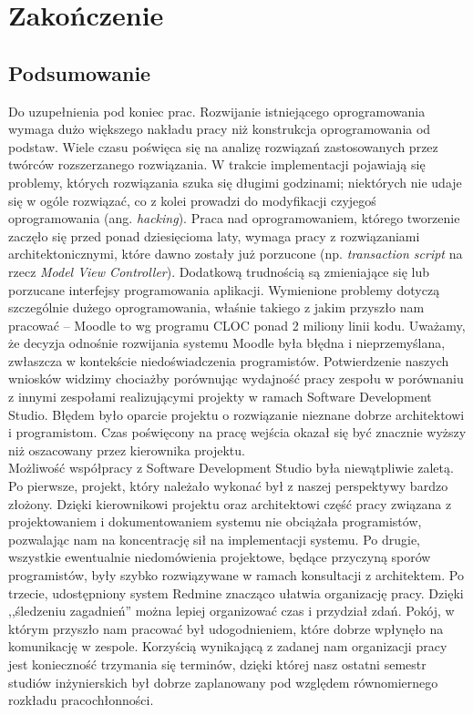 \chapter{Zakończenie}
\label{Chapter9}

\section{Podsumowanie}
\label{Chapter91}

{\color{red}Do uzupełnienia pod koniec prac.}
Rozwijanie istniejącego oprogramowania wymaga dużo większego nakładu pracy niż konstrukcja oprogramowania od podstaw. Wiele czasu poświęca się na analizę rozwiązań zastosowanych przez twórców rozszerzanego rozwiązania. W trakcie implementacji pojawiają się problemy, których rozwiązania szuka się długimi godzinami; niektórych nie udaje się w ogóle rozwiązać, co z kolei prowadzi do modyfikacji czyjegoś oprogramowania (ang. \emph{hacking}). Praca nad oprogramowaniem, którego tworzenie zaczęło się przed ponad dziesięcioma laty, wymaga pracy z rozwiązaniami architektonicznymi, które dawno zostały już porzucone (np. \emph{transaction script} na rzecz \emph{Model View Controller}). Dodatkową trudnością są zmieniające się lub porzucane interfejsy programowania aplikacji. Wymienione problemy dotyczą szczególnie dużego oprogramowania, właśnie takiego z jakim przyszło nam pracować -- Moodle to wg programu CLOC ponad 2 miliony linii kodu. Uważamy, że decyzja odnośnie rozwijania systemu Moodle była błędna i nieprzemyślana, zwłaszcza w kontekście niedoświadczenia programistów. Potwierdzenie naszych wniosków widzimy chociażby porównując wydajność pracy zespołu w porównaniu z innymi zespołami realizującymi projekty w ramach Software Development Studio. Błędem było oparcie projektu o rozwiązanie nieznane dobrze architektowi i programistom. Czas poświęcony na pracę wejścia okazał się być znacznie wyższy niż oszacowany przez kierownika projektu.\\

Możliwość współpracy z Software Development Studio była niewątpliwie zaletą. Po pierwsze, projekt, który należało wykonać był z naszej perspektywy bardzo złożony. Dzięki kierownikowi projektu oraz architektowi część pracy związana z projektowaniem i dokumentowaniem systemu nie obciążała programistów, pozwalając nam na koncentrację sił na implementacji systemu. Po drugie, wszystkie ewentualnie niedomówienia projektowe, będące przyczyną sporów programistów, były szybko rozwiązywane w ramach konsultacji z architektem. Po trzecie, udostępniony system Redmine znacząco ułatwia organizację pracy. Dzięki ,,śledzeniu zagadnień'' można lepiej organizować czas i przydział zdań. Pokój, w którym przyszło nam pracować był udogodnieniem, które dobrze wpłynęło na komunikację w zespole. Korzyścią wynikającą z zadanej nam organizacji pracy jest konieczność trzymania się terminów, dzięki której nasz ostatni semestr studiów inżynierskich był dobrze zaplanowany pod względem równomiernego rozkładu pracochłonności.\\

